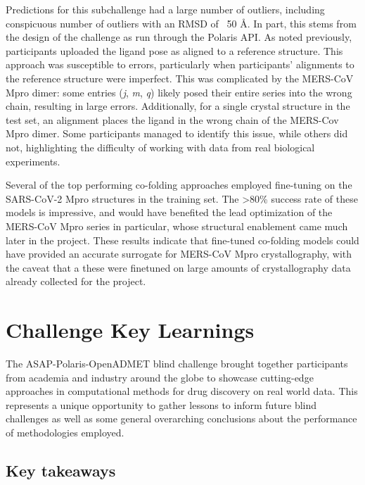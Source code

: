 \documentclass[journal=jcim,manuscript=article]{achemso}
\begin{document}
Predictions for this subchallenge had a large number of outliers, including conspicuous number of outliers with an RMSD of ~50 Å. In part, this stems from the design of the challenge as run through the Polaris API. As noted previously, participants uploaded the ligand pose as aligned to a reference structure. This approach was susceptible to errors, particularly when participants’ alignments to the reference structure were imperfect. This was complicated by the MERS-CoV Mpro dimer: some entries (\textit{j}, \textit{m}, \textit{q}) likely posed their entire series into the wrong chain, resulting in large errors. Additionally, for a single crystal structure in the test set, an alignment places the ligand in the wrong chain of the MERS-Cov Mpro dimer. Some participants managed to identify this issue, while others did not, highlighting the difficulty of working with data from real biological experiments.

Several of the top performing co-folding approaches employed fine-tuning on the SARS-CoV-2 Mpro structures in the training set. The \textgreater 80\% success rate of these models is impressive, and would have benefited the lead optimization of the MERS-CoV Mpro series in particular, whose structural enablement came much later in the project. These results indicate that fine-tuned co-folding models could have provided an accurate surrogate for MERS-CoV Mpro crystallography, with the caveat that a these were finetuned on large amounts of crystallography data already collected for the project.

\section{Challenge Key Learnings}

The ASAP-Polaris-OpenADMET blind challenge brought together participants from academia and industry around the globe to showcase cutting-edge approaches in computational methods for drug discovery on real world data. This represents a unique opportunity to gather lessons to inform future blind challenges as well as some general overarching conclusions about the performance of methodologies employed.


\subsection{Key takeaways}
\end{document}
